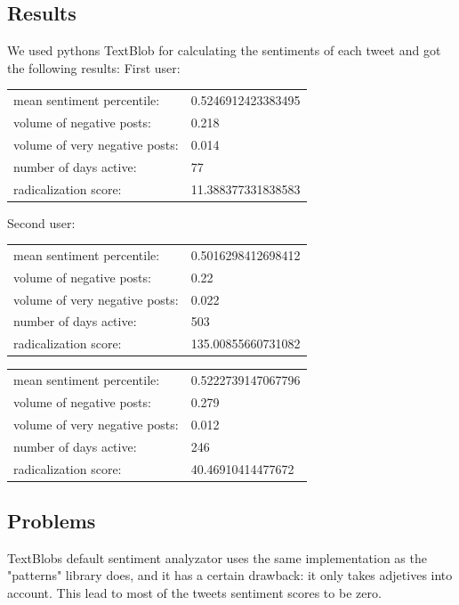 \documentclass[conference]{IEEEtran}
\begin{document}
\subsection{Results}
We used pythons TextBlob for calculating the sentiments of each tweet and got the following results:
First user:
\begin{table}[]
  \begin{tabular}{ll}
  mean sentiment percentile:     & 0.5246912423383495 \\
  volume of negative posts:      & 0.218              \\
  volume of very negative posts: & 0.014              \\
  number of days active:         & 77                 \\
  radicalization score:          & 11.388377331838583
  \end{tabular}
\end{table}
Second user:
\begin{table}[]
  \begin{tabular}{ll}
  mean sentiment percentile:     & 0.5016298412698412 \\
  volume of negative posts:      & 0.22               \\
  volume of very negative posts: & 0.022              \\
  number of days active:         & 503                \\
  radicalization score:          & 135.00855660731082
  \end{tabular}
\end{table}
\begin{table}[]
  \begin{tabular}{ll}
  mean sentiment percentile:     & 0.5222739147067796 \\
  volume of negative posts:      & 0.279               \\
  volume of very negative posts: & 0.012              \\
  number of days active:         & 246                \\
  radicalization score:          & 40.46910414477672
  \end{tabular}
\end{table}
\subsection{Problems}
TextBlobs default sentiment analyzator uses the same implementation as the "patterns" library does, and it has a certain drawback: it only takes adjetives into account. 
This lead to most of the tweets sentiment scores to be zero.\\
\end{document}
